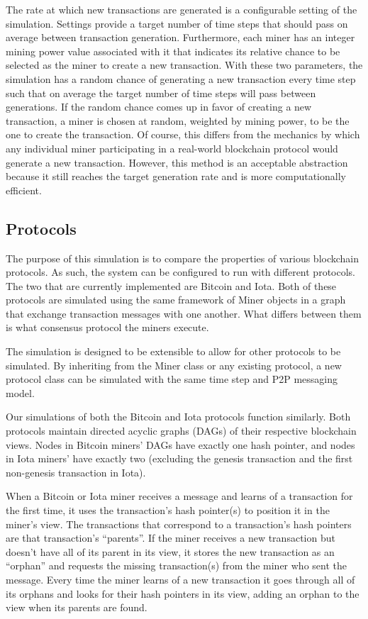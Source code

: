 \documentclass[letterpaper,11pt]{article}
\begin{document}
The rate at which new transactions are generated is a configurable setting of the simulation. Settings provide a target number of time steps that should pass on average between transaction generation. Furthermore, each miner has an integer mining power value associated with it that indicates its relative chance to be selected as the miner to create a new transaction. With these two parameters, the simulation has a random chance of generating a new transaction every time step such that on average the target number of time steps will pass between generations. If the random chance comes up in favor of creating a new transaction, a miner is chosen at random, weighted by mining power, to be the one to create the transaction. Of course, this differs from the mechanics by which any individual miner participating in a real-world blockchain protocol would generate a new transaction. However, this method is an acceptable abstraction because it still reaches the target generation rate and is more computationally efficient.

\subsection{Protocols}
The purpose of this simulation is to compare the properties of various blockchain protocols. As such, the system can be configured to run with different protocols. The two that are currently implemented are Bitcoin and Iota. Both of these protocols are simulated using the same framework of Miner objects in a graph that exchange transaction messages with one another. What differs between them is what consensus protocol the miners execute.

The simulation is designed to be extensible to allow for other protocols to be simulated. By inheriting from the Miner class or any existing protocol, a new protocol class can be simulated with the same time step and P2P messaging model.

Our simulations of both the Bitcoin and Iota protocols function similarly. Both protocols maintain directed acyclic graphs (DAGs) of their respective blockchain views. Nodes in Bitcoin miners' DAGs have exactly one hash pointer, and nodes in Iota miners' have exactly two (excluding the genesis transaction and the first non-genesis transaction in Iota).

When a Bitcoin or Iota miner receives a message and learns of a transaction for the first time, it uses the transaction's hash pointer(s) to position it in the miner's view. The transactions that correspond to a transaction's hash pointers are that transaction's ``parents''. If the miner receives a new transaction but doesn't have all of its parent in its view, it stores the new transaction as an ``orphan'' and requests the missing transaction(s) from the miner who sent the message. Every time the miner learns of a new transaction it goes through all of its orphans and looks for their hash pointers in its view, adding an orphan to the view when its parents are found.
\end{document}
